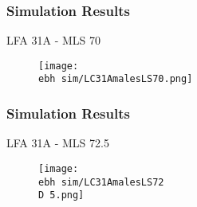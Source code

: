 \documentclass{beamer}
\newcommand{\ebh}{\string~/bio.data/bio.lobster/figures/LFA2733Framework2018/} %
\newcommand{\D}{.}
\begin{document}
%
%
%
%





\begin{frame}
\frametitle{Simulation Results}
LFA 31A - MLS 70
\begin{figure}
        \begin{center}
            \texttt{[image: \\ebh sim/LC31AmalesLS70.png]}
        \end{center}
    \end{figure}
\end{frame}


\begin{frame}
\frametitle{Simulation Results}
LFA 31A - MLS 72.5
\begin{figure}
        \begin{center}
            \texttt{[image: \\ebh sim/LC31AmalesLS72\\D 5.png]}
        \end{center}
    \end{figure}
\end{frame}
\end{document}
